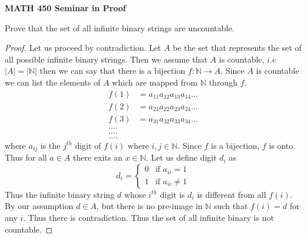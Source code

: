 \documentclass[14pt]{article}
\newcommand{\N}{\mathbb N}
\begin{document}
\begin{center}
		
{\bf MATH 450 Seminar in Proof}
 \\
\end{center}
	Prove that the set of all infinite binary strings are uncountable.
\begin{proof}
	Let us proceed by contradiction. Let $A$ be the set that represents the set of all possible infinite binary strings. Then we assume that $A$ is countable, $i.e$ $|A| = | \N |$ then we can say that there is a bijection $f: \N \rightarrow A$. Since $A$ is countable we can list the elements of $A$ which are mapped from $\N$ through $f$.
	\begin{align*}
	f(1) &= a_{11} a_{12}a_{13}a_{14}... \\
	f(2) &= a_{21}a_{22}a_{23}a_{24}... \\
	f(3) &= a_{31}a_{32}a_{33}a_{34}... \\
	....\\
	....\\
	.... 		
	\end{align*}
	where $a_{ij}$ is the $j^{th}$ digit of $f(i)$ where $i,j \in \N$. Since $f$ is a bijection, $f$ is onto. Thus for all $a \in A$ there exits an $x \in \N$. Let us define digit $d_i$ as
	 \[
d_i =
\begin{cases}
 0 & \text{if } a_{ii} = 1 \\
 1 & \text{if } a_{ii} \neq 1
\end{cases}
\] 
Thus the infinite binary string $d$ whose $i^{th}$ digit is $d_i$ is different from all $f(i)$. By our assumption $d \in A$, but there is no pre-image in $\N$ such that $f(i) = d$ for any $i$. Thus there is contradiction. Thus the set of all infinite binary is not countable. 
\end{proof}
\end{document}

